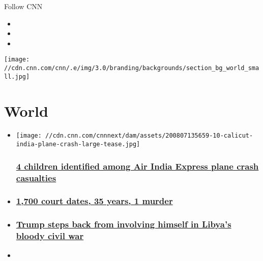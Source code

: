 Follow CNN

\begin{itemize}
\item
\item
\item
\end{itemize}

\texttt{[image: //cdn.cnn.com/cnn/.e/img/3.0/branding/backgrounds/section\_bg\_world\_small.jpg]}

\hypertarget{world}{%
\section{World}\label{world}}

\begin{itemize}
\item
  \href{/2020/08/08/asia/air-india-express-plane-crash-kerala-intl/index.html}{}

  \texttt{[image: //cdn.cnn.com/cnnnext/dam/assets/200807135659-10-calicut-india-plane-crash-large-tease.jpg]}

  \hypertarget{4-children-identified-among-air-india-express-plane-crash-casualties}{%
  \subsubsection{\texorpdfstring{\href{/2020/08/08/asia/air-india-express-plane-crash-kerala-intl/index.html}{4
  children identified among Air India Express plane crash
  casualties}}{4 children identified among Air India Express plane crash casualties}}\label{4-children-identified-among-air-india-express-plane-crash-casualties}}
\item
  \hypertarget{1700-court-dates-35-years-1-murder}{%
  \subsubsection{\texorpdfstring{\href{/2020/08/07/asia/india-maharaja-police-sentence-intl-dst-hnk/index.html}{1,700
  court dates, 35 years, 1
  murder}}{1,700 court dates, 35 years, 1 murder}}\label{1700-court-dates-35-years-1-murder}}
\item
  \hypertarget{trump-steps-back-from-involving-himself-in-libyas-bloody-civil-war}{%
  \subsubsection{\texorpdfstring{\href{/2020/08/08/politics/trump-libya-civil-war/index.html}{Trump
  steps back from involving himself in Libya's bloody civil
  war}}{Trump steps back from involving himself in Libya's bloody civil war}}\label{trump-steps-back-from-involving-himself-in-libyas-bloody-civil-war}}
\item
  \hypertarget{plane-aborted-first-landing-before-skidding-off-runway-killing-at-least-17}{%
}
\end{itemize}
